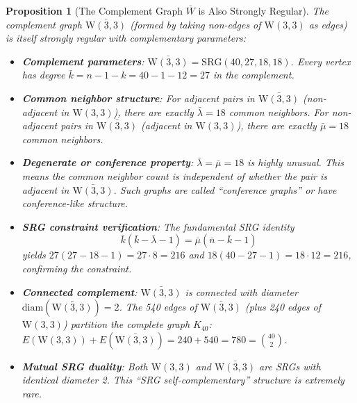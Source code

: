 \documentclass[12pt,a4paper]{article}
\newtheorem{proposition}[theorem]{Proposition}
\newcommand{\W}{\mathrm{W}(3,3)}
\begin{document}
\begin{proposition}[The Complement Graph $\bar{W}$ is Also Strongly Regular]\label{prop:complement}
The complement graph $\bar{\W}$ (formed by taking non-edges of $\W$ as edges)
is itself strongly regular with complementary parameters:
\begin{itemize}
  \item \textbf{Complement parameters}: $\bar{\W} = \mathrm{SRG}(40, 27, 18, 18)$.
        Every vertex has degree $\bar{k} = n - 1 - k = 40 - 1 - 12 = 27$ in the complement.
  \item \textbf{Common neighbor structure}: For adjacent pairs in $\bar{\W}$ (non-adjacent in $\W$),
        there are exactly $\bar{\lambda} = 18$ common neighbors. For non-adjacent pairs in $\bar{\W}$
        (adjacent in $\W$), there are exactly $\bar{\mu} = 18$ common neighbors.
  \item \textbf{Degenerate or conference property}: $\bar{\lambda} = \bar{\mu} = 18$ is highly unusual.
        This means the common neighbor count is \emph{independent} of whether the pair is adjacent
        in $\bar{\W}$. Such graphs are called ``conference graphs'' or have conference-like structure.
  \item \textbf{SRG constraint verification}: The fundamental SRG identity
        \[
          \bar{k}(\bar{k} - \bar{\lambda} - 1) = \bar{\mu}(\bar{n} - \bar{k} - 1)
        \]
        yields $27(27-18-1) = 27 \cdot 8 = 216$ and $18(40-27-1) = 18 \cdot 12 = 216$, confirming the constraint.
  \item \textbf{Connected complement}: $\bar{\W}$ is connected with diameter $\mathrm{diam}(\bar{\W}) = 2$.
        The 540 edges of $\bar{\W}$ (plus 240 edges of $\W$) partition the complete graph $K_{40}$: %
        $E(\W) + E(\bar{\W}) = 240 + 540 = 780 = \binom{40}{2}$. %
  \item \textbf{Mutual SRG duality}: Both $\W$ and $\bar{\W}$ are SRGs with identical diameter 2.
        This ``SRG self-complementary'' structure is extremely rare.
\end{itemize}
\end{proposition}
\end{document}
